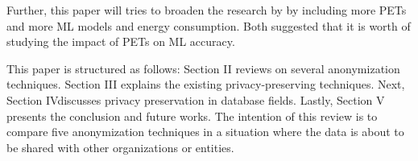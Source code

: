 Further, this paper will tries to broaden the research by \cite{oprescu2022energy, hoyos2020contribution} by including more PETs and more ML models and energy consumption. Both suggested that it is worth of studying the impact of PETs on ML accuracy.

This paper is structured as follows: Section II reviews on several  anonymization  techniques.  Section  III  explains  the  existing   privacy-preserving   techniques.   Next,   Section   IVdiscusses  privacy  preservation  in  database  fields.  Lastly,  Section  V  presents  the  conclusion  and  future  works.  The  intention  of  this  review  is  to  compare  five  anonymization  techniques in a situation where the data is about to be shared with other organizations or entities.





